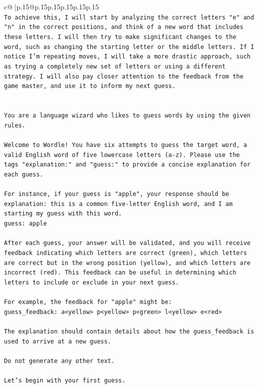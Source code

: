 \documentclass{article}
\begin{document}
{\begin{supertabular}{c@{$\;$}|p{.15\linewidth}@{}p{.15\linewidth}p{.15\linewidth}p{.15\linewidth}p{.15\linewidth}p{.15\linewidth}}
{{{\\ 
\texttt{To achieve this, I will start by analyzing the correct letters "e" and "n" in the correct positions, and think of a new word that includes these letters. I will then try to make significant changes to the word, such as changing the starting letter or the middle letters. If I notice I'm repeating moves, I will take a more drastic approach, such as trying a completely new set of letters or using a different strategy. I will also pay closer attention to the feedback from the game master, and use it to inform my next guess.} \\
\\ 
\\ 
\texttt{You are a language wizard who likes to guess words by using the given rules.} \\
\\ 
\texttt{Welcome to Wordle! You have six attempts to guess the target word, a valid English word of five lowercase letters (a{-}z). Please use the tags "explanation:" and "guess:" to provide a concise explanation for each guess.} \\
\\ 
\texttt{For instance, if your guess is "apple", your response should be} \\
\texttt{explanation: this is a common five{-}letter English word, and I am starting my guess with this word.} \\
\texttt{guess: apple} \\
\\ 
\texttt{After each guess, your answer will be validated, and you will receive feedback indicating which letters are correct (green), which letters are correct but in the wrong position (yellow), and which letters are incorrect (red). This feedback can be useful in determining which letters to include or exclude in your next guess.} \\
\\ 
\texttt{For example, the feedback for "apple" might be:} \\
\texttt{guess\_feedback: a<yellow> p<yellow> p<green> l<yellow> e<red>} \\
\\ 
\texttt{The explanation should contain details about how the guess\_feedback is used to arrive at a new guess.} \\
\\ 
\texttt{Do not generate any other text.} \\
\\ 
\texttt{Let's begin with your first guess.} \\
            }
        }
    }
     \\ \\


\end{supertabular}}
\end{document}
